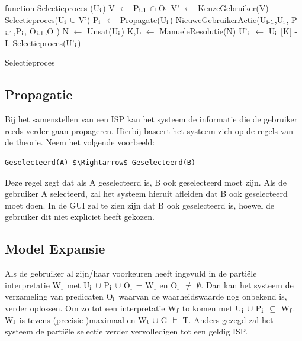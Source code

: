 \begin{algorithm}
	\underline{function Selectieproces} (U$\textsubscript{i}$)\;
	\Output{}
		{
		V $\leftarrow$ P$\textsubscript{i-1}$ $\cap$ O$\textsubscript{i}$\;
			{
			V' $\leftarrow$ KeuzeGebruiker(V)\; 
			Selectieproces(U$\textsubscript{i}$ $\cup$ V')\;
			}
			{
			P$\textsubscript{i}$ $\leftarrow$ Propagate(U$\textsubscript{i}$)\;	
			NieuweGebruikerActie(U$\textsubscript{i-1}$,U$\textsubscript{i}$,
			P$\textsubscript{i-1}$,P$\textsubscript{i}$,
			O$\textsubscript{i-1}$,O$\textsubscript{i}$)\;
			}
		}
		{
		N $\leftarrow$ Unsat(U$\textsubscript{i}$)\; 
		K,L $\leftarrow$ ManueleResolutie(N)\;
		U'$\textsubscript{i}$ $\leftarrow$ U$\textsubscript{i}$ 
		[K] - L\; 
		Selectieproces(U'$\textsubscript{i}$)\;
		}
	\caption{Selectieproces}
\end{algorithm}

\subsection{Propagatie}
Bij het samenstellen van een ISP kan het systeem de informatie die de gebruiker reeds verder gaan propageren. Hierbij baseert het systeem zich op de regels van de theorie. Neem het volgende voorbeeld: 
\begin{lstlisting}[mathescape]
Geselecteerd(A) $\Rightarrow$ Geselecteerd(B)
\end{lstlisting}
Deze regel zegt dat als A geselecteerd is, B ook geselecteerd moet zijn. Als de gebruiker A selecteerd, zal het systeem hieruit afleiden dat B ook geselecteerd moet doen. In de GUI zal te zien zijn dat B ook geselecteerd is, hoewel de gebruiker dit niet expliciet heeft gekozen.

\subsection{Model Expansie}
Als de gebruiker al zijn/haar voorkeuren heeft ingevuld in de parti\"{e}le interpretatie W$\textsubscript{i}$ met U$\textsubscript{i}$ $\cup$ P$\textsubscript{i}$ $\cup$ O$\textsubscript{i}$ = W$\textsubscript{i}$ en O$\textsubscript{i}$ $\neq$ $\emptyset$. Dan kan het systeem de verzameling van predicaten O$\textsubscript{i}$ waarvan de waarheidswaarde nog onbekend is, verder oplossen. Om zo tot een interpretatie W$\textsubscript{f}$ to komen met U$\textsubscript{i}$ $\cup$ P$\textsubscript{i}$ $\subseteq$ W$\textsubscript{f}$. W$\textsubscript{f}$ is tevens (precisie )maximaal en W$\textsubscript{f}$ $\cup$ G $\models$ T. Anders gezegd zal het systeem de parti\"{e}le selectie verder vervolledigen tot een geldig ISP. 

